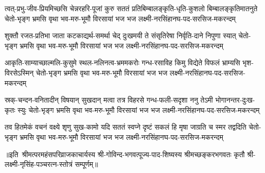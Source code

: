 
\begingroup
\setlength{\shlokaspaceskip}{10pt}
\fourlineindentedshloka
{त्वत्-प्रभु-जीव-प्रियमिच्छसि चेन्नरहरि-पूजां कुरु सततं}
{प्रतिबिम्बालङ्कृति-धृति-कुशलो बिम्बालङ्कृतिमातनुते}
{चेतो-भृङ्ग भ्रमसि वृथा भव-मरु-भूमौ विरसायां}
{भज भज लक्ष्मी-नरसिंहानघ-पद-सरसिज-मकरन्दम्}%

\fourlineindentedshloka
{शुक्तौ रजत-प्रतिभा जाता कटकाद्यर्थ-समर्था चेद्}
{दुःखमयी ते संसृतिरेषा निर्वृति-दाने निपुणा स्यात्}
{चेतो-भृङ्ग भ्रमसि वृथा भव-मरु-भूमौ विरसायां}
{भज भज लक्ष्मी-नरसिंहानघ-पद-सरसिज-मकरन्दम्}%

\fourlineindentedshloka
{आकृति-साम्याच्छाल्मलि-कुसुमे स्थल-नलिनत्व-भ्रममकरोः}
{गन्ध-रसाविह किमु विद्येते विफलं भ्राम्यसि भृश-विरसेऽस्मिन्}
{चेतो-भृङ्ग भ्रमसि वृथा भव-मरु-भूमौ विरसायां}
{भज भज लक्ष्मी-नरसिंहानघ-पद-सरसिज-मकरन्दम्}%

\fourlineindentedshloka
{स्रक्-चन्दन-वनितादीन् विषयान् सुखदान् मत्वा तत्र विहरसे}
{गन्ध-फली-सदृशा ननु तेऽमी भोगानन्तर-दुःख-कृतः स्युः}
{चेतो-भृङ्ग भ्रमसि वृथा भव-मरु-भूमौ विरसायां}
{भज भज लक्ष्मी-नरसिंहानघ-पद-सरसिज-मकरन्दम्}%

\fourlineindentedshloka
{तव हितमेकं वचनं वक्ष्ये श‍ृणु सुख-कामो यदि सततं}
{स्वप्ने दृष्टं सकलं हि मृषा जाग्रति च स्मर तद्वदिति}
{चेतो-भृङ्ग भ्रमसि वृथा भव-मरु-भूमौ विरसायां}
{भज भज लक्ष्मी-नरसिंहानघ-पद-सरसिज-मकरन्दम्}%

॥इति~श्रीमत्परमहंसपरिव्राजकाचार्यस्य श्री-गोविन्द-भगवत्पूज्य-पाद-शिष्यस्य
श्रीमच्छङ्करभगवतः कृतौ श्री-लक्ष्मी-नृसिंह-पञ्चरत्न-स्तोत्रं सम्पूर्णम्॥

\endgroup